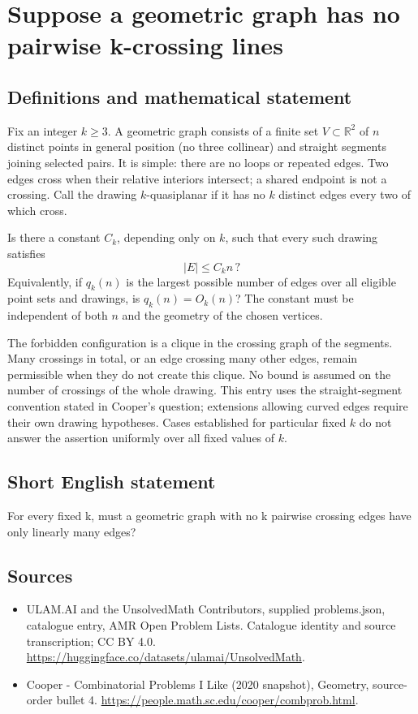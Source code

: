 \documentclass[11pt,a4paper]{article}
\begin{document}
\section*{Suppose a geometric graph has no pairwise k-crossing lines}\label{statement}

\subsection{Definitions and mathematical statement}
Fix an integer $k\ge3$. A geometric graph consists of a finite set
$V\subset\mathbb R^2$ of $n$ distinct points in general position
(no three collinear) and straight segments joining selected pairs.
It is simple: there are no loops or repeated edges. Two edges cross
when their relative interiors intersect; a shared endpoint is not
a crossing. Call the drawing $k$-quasiplanar if it has no $k$ distinct
edges every two of which cross.

Is there a constant $C_k$, depending only on $k$, such that every such
drawing satisfies
\[
                       |E|\le C_k n\,?
\]
Equivalently, if $q_k(n)$ is the largest possible number of edges
over all eligible point sets and drawings, is $q_k(n)=O_k(n)$?
The constant must be independent of both $n$ and the geometry of
the chosen vertices.

The forbidden configuration is a clique in the crossing graph of
the segments. Many crossings in total, or an edge crossing many
other edges, remain permissible when they do not create this clique.
No bound is assumed on the number of crossings of the whole drawing.
This entry uses the straight-segment convention stated in Cooper's
question; extensions allowing curved edges require their own drawing
hypotheses. Cases established for particular fixed $k$ do not answer
the assertion uniformly over all fixed values of $k$.
\subsection{Short English statement}
For every fixed k, must a geometric graph with no k pairwise crossing edges have only linearly many edges?
\subsection{Sources}
\begin{itemize}
\item[S1] ULAM.AI and the UnsolvedMath Contributors, supplied problems.json, catalogue entry, AMR Open Problem Lists. Catalogue identity and source transcription; CC BY 4.0.
\url{https://huggingface.co/datasets/ulamai/UnsolvedMath}.
\item[S2] Cooper - Combinatorial Problems I Like (2020 snapshot), Geometry, source-order bullet 4. 
\url{https://people.math.sc.edu/cooper/combprob.html}.
\end{itemize}
\end{document}

